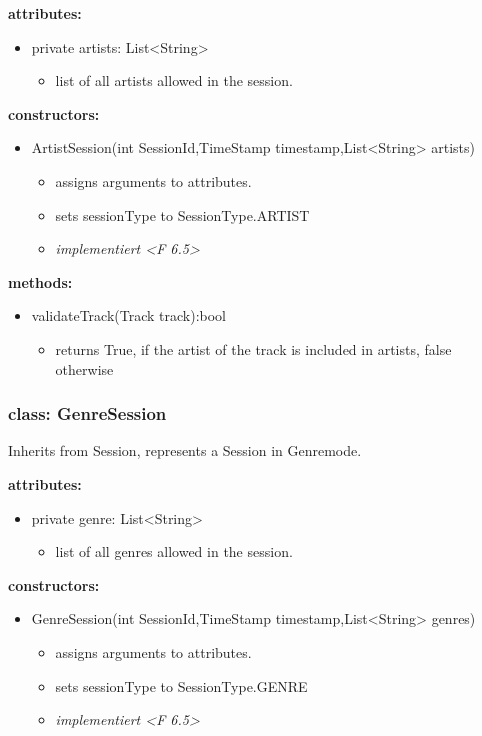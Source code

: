 \documentclass[oneside, ngerman]{sdqtechreport}
\begin{document}
\textbf{attributes:}
\begin{itemize}
    \item private artists: List<String>
    \begin{itemize}
        \item list of all artists allowed in the session.
    \end{itemize}
\end{itemize}
\textbf{constructors:}
\begin{itemize}
    \item ArtistSession(int SessionId,TimeStamp timestamp,List<String> artists)
    \begin{itemize}
        \item assigns arguments to attributes.
        \item sets sessionType to SessionType.ARTIST
        \item \textit{implementiert <F 6.5>}
    \end{itemize}
\end{itemize}

\textbf{methods:}
\begin{itemize}
    \item validateTrack(Track track):bool
    \begin{itemize}
        \item returns True, if the artist of the track is included in artists, false otherwise
    \end{itemize}
\end{itemize}

\subsubsection{class: GenreSession}
Inherits from Session, represents a Session in Genremode.

\textbf{attributes:}
\begin{itemize}
    \item private genre: List<String>
    \begin{itemize}
        \item list of all genres allowed in the session.
    \end{itemize}
\end{itemize}
\textbf{constructors:}
\begin{itemize}
    \item GenreSession(int SessionId,TimeStamp timestamp,List<String> genres)
    \begin{itemize}
        \item assigns arguments to attributes.
        \item sets sessionType to SessionType.GENRE
        \item \textit{implementiert <F 6.5>}
    \end{itemize}
\end{itemize}
\end{document}
